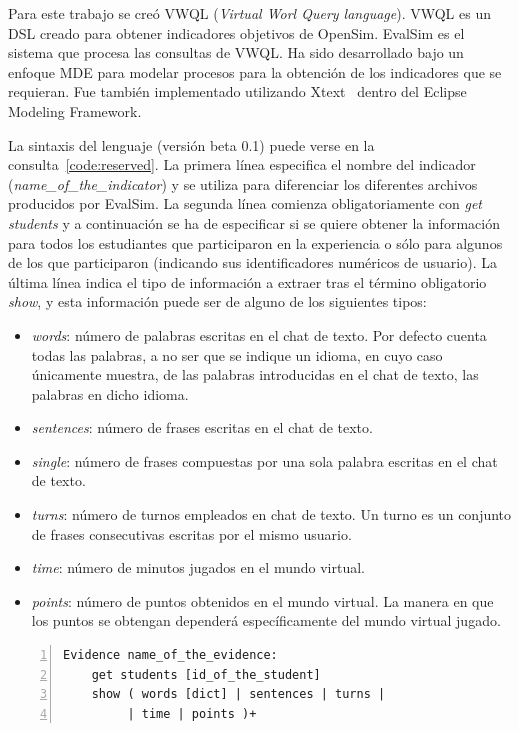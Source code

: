 			Para este trabajo se creó VWQL (\emph{Virtual Worl Query language}). VWQL es un DSL creado para obtener indicadores objetivos de OpenSim. EvalSim es el sistema que procesa las consultas de VWQL. Ha sido desarrollado bajo un enfoque MDE para modelar procesos para la obtención de los indicadores que se requieran. Fue también implementado utilizando Xtext~\cite{eysholdt2010xtext} dentro del Eclipse Modeling Framework.

			La sintaxis del lenguaje (versión beta 0.1) puede verse en la consulta~\ref{code:reserved}. La primera línea especifica el nombre del indicador (\emph{name\_of\_the\_indicator}) y se utiliza para diferenciar los diferentes archivos producidos por EvalSim. La segunda línea comienza obligatoriamente con \emph{get students} y a continuación se ha de especificar si se quiere obtener la información para todos los estudiantes que participaron en la experiencia o sólo para algunos de los que participaron (indicando sus identificadores numéricos de usuario). La última línea indica el tipo de información a extraer tras el término obligatorio \emph{show}, y esta información puede ser de alguno de los siguientes tipos:

\begin{itemize}
\item \emph{words}: número de palabras escritas en el chat de texto. Por defecto cuenta todas las palabras, a no ser que se indique un idioma, en cuyo caso únicamente muestra, de las palabras introducidas en el chat de texto, las palabras en dicho idioma.
\item \emph{sentences}: número de frases escritas en el chat de texto.
\item \emph{single}: número de frases compuestas por una sola palabra escritas en el chat de texto.
\item \emph{turns}: número de turnos empleados en chat de texto. Un turno es un conjunto de frases consecutivas escritas por el mismo usuario.
\item \emph{time}: número de minutos jugados en el mundo virtual.
\item \emph{points}: número de puntos obtenidos en el mundo virtual. La manera en que los puntos se obtengan dependerá específicamente del mundo virtual jugado.
\end{itemize}

\begin{lstlisting}[caption=Palabras reservadas y formato de VWQL (version 0.1), label=code:reserved,numbers=left, captionpos=b, morekeywords={Evidence,get, students, show, words, sentences, turns, time, points}]
Evidence name_of_the_evidence:
    get students [id_of_the_student]
    show ( words [dict] | sentences | turns |
         | time | points )+
\end{lstlisting}

